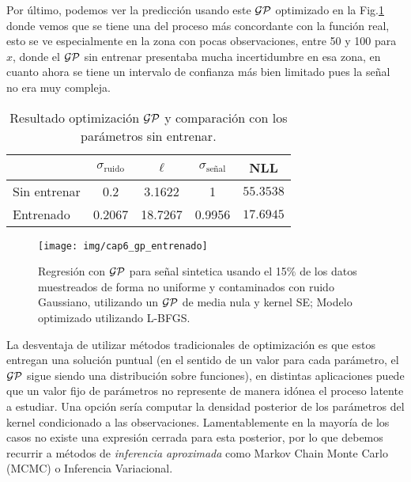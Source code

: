 Por último, podemos ver la predicción usando este $\mathcal{GP}$ optimizado en la Fig.\ref{fig:gp_5} donde vemos que se tiene una del proceso más concordante con la función real, esto se ve especialmente en la zona con pocas observaciones, entre 50 y 100 para $x$, donde el $\mathcal{GP}$ sin entrenar presentaba mucha incertidumbre en esa zona, en cuanto ahora se tiene un intervalo de confianza más bien limitado pues la señal no era muy compleja.

\begin{table}[H]
\centering
\begin{tabular}{lcccc}
 & $\sigma_{\text{ruido}}$ & $\ell$ & $\sigma_{\text{señal}}$ & NLL\\ \hline
Sin entrenar & 0.2 & 3.1622 & 1 & $\mathbf{55.3538}$\\
Entrenado & 0.2067 & 18.7267 & 0.9956 & $\mathbf{17.6945}$\\
\end{tabular}
\caption{Resultado optimización $\mathcal{GP}$ y comparación con los parámetros sin entrenar.}
\label{tab:gp_1}
\end{table}


\begin{figure}[H]
	\centering
	\texttt{[image: img/cap6\_gp\_entrenado]}
	\caption{Regresión con $\mathcal{GP}$ para señal sintetica usando el 15$\%$ de los datos muestreados de forma no uniforme y contaminados con ruido Gaussiano, utilizando un $\mathcal{GP}$ de media nula y kernel SE; Modelo optimizado utilizando L-BFGS.}
	\label{fig:gp_5}
\end{figure}

La desventaja de utilizar métodos tradicionales de optimización es que estos entregan una solución puntual (en el sentido de un valor para cada parámetro, el $\mathcal{GP}$ sigue siendo una distribución sobre funciones), en distintas aplicaciones puede que un valor fijo de parámetros no represente de manera idónea el proceso latente a estudiar. Una opción sería computar la densidad posterior de los parámetros del kernel condicionado a las observaciones. Lamentablemente en la mayoría de los casos no existe una expresión cerrada para esta posterior, por lo que debemos recurrir a métodos de \textit{inferencia aproximada} como Markov Chain Monte Carlo (MCMC) o Inferencia Variacional.





